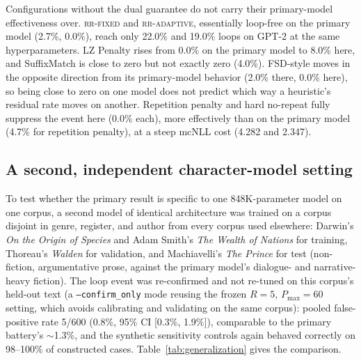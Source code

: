 \documentclass[11pt]{article}
\begin{document}
Configurations without the dual guarantee do not carry their primary-model effectiveness over. \textsc{rr-fixed} and \textsc{rr-adaptive}, essentially loop-free on the primary model (2.7\%, 0.0\%), reach only 22.0\% and 19.0\% loops on GPT-2 at the same hyperparameters. LZ Penalty rises from 0.0\% on the primary model to 8.0\% here, and SuffixMatch is close to zero but not exactly zero (4.0\%). FSD-style moves in the opposite direction from its primary-model behavior (2.0\% there, 0.0\% here), so being close to zero on one model does not predict which way a heuristic's residual rate moves on another. Repetition penalty and hard no-repeat fully suppress the event here (0.0\% each), more effectively than on the primary model (4.7\% for repetition penalty), at a steep mcNLL cost (4.282 and 2.347).

\subsection{A second, independent character-model setting}
To test whether the primary result is specific to one 848K-parameter model on one corpus, a second model of identical architecture was trained on a corpus disjoint in genre, register, and author from every corpus used elsewhere: Darwin's \emph{On the Origin of Species} and Adam Smith's \emph{The Wealth of Nations} for training, Thoreau's \emph{Walden} for validation, and Machiavelli's \emph{The Prince} for test (non-fiction, argumentative prose, against the primary model's dialogue- and narrative-heavy fiction). The loop event was re-confirmed and not re-tuned on this corpus's held-out text (a \texttt{--confirm\_\allowbreak{}only} mode reusing the frozen $R{=}5$, $P_{\max}{=}60$ setting, which avoids calibrating and validating on the same corpus): pooled false-positive rate 5/600 (0.8\%, 95\% CI [0.3\%, 1.9\%]), comparable to the primary battery's $\sim$1.3\%, and the synthetic sensitivity controls again behaved correctly on 98--100\% of constructed cases. Table~\ref{tab:generalization} gives the comparison.
\end{document}
